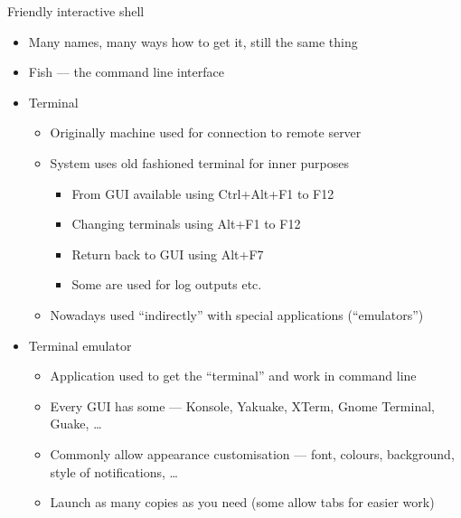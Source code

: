 \documentclass[compress, ucs, xelatex, 11pt, xcolor=svgnames,
  hyperref={
    bookmarks=true,
    unicode=true,
    colorlinks=true,
    pdftitle={Linux, command line and MetaCentrum},
    plainpages=false,
    pdfauthor={Vojtech Zeisek},
    pdfsubject={Course about use of Linux command line, writing shell scripts and using MetaCentrum of CESNET},
    pdfcreator={XeLaTeX, http://www.xelatex.org/},
    pdfkeywords={Linux, GNU, BASH, shell, command line, MetaCentrum},
    linkcolor=Sienna,
    anchorcolor=black,
    citecolor=green,
    filecolor=magenta,
    menucolor=Sienna,
    urlcolor=cyan,
    pdftex},
  url={hyphens, lowtilde} %
  ]{beamer}
\begin{document}
\begin{frame}{Friendly interactive shell}
\begin{itemize}
  \item Many names, many ways how to get it, still the same thing
  \item Fish --- the command line interface
  \item Terminal
  \begin{itemize}
    \item Originally machine used for connection to remote server
    \item System uses old fashioned terminal for inner purposes
    \begin{itemize}
      \item From GUI available using Ctrl+Alt+F1 to F12
      \item Changing terminals using Alt+F1 to F12
      \item Return back to GUI using Alt+F7
      \item Some are used for log outputs etc.
    \end{itemize}
    \item Nowadays used ``indirectly'' with special applications (``emulators'')
  \end{itemize}
  \item Terminal emulator
  \begin{itemize}
    \item Application used to get the ``terminal'' and work in command line
    \item Every GUI has some --- Konsole, Yakuake, XTerm, Gnome Terminal, Guake, \ldots
    \item Commonly allow appearance customisation --- font, colours, background, style of notifications, \ldots
    \item Launch as many copies as you need (some allow tabs for easier work)
  \end{itemize}
\end{itemize}
\end{frame}
\end{document}
